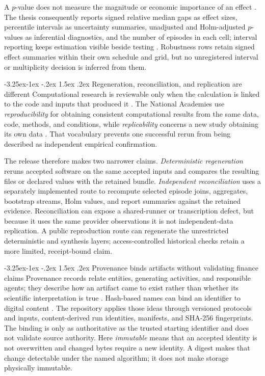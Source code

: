 \documentclass[12pt,a4paper,oneside]{report}
\makeatletter
\renewcommand\subsection{\@startsection{subsection}{2}{\z@}%
  {-3.25ex\@plus -1ex \@minus -.2ex}%
  {1.5ex \@plus .2ex}%
  {\normalfont\fontsize{12}{15}\selectfont\bfseries}}
\makeatother
\begin{document}
A $p$-value does not measure the magnitude or economic importance of an effect
\citep{wassersteinlazar2016}. The thesis consequently reports signed relative
median gaps as effect sizes, percentile intervals as uncertainty summaries,
unadjusted and Holm-adjusted $p$-values as inferential diagnostics, and the
number of episodes in each cell; interval reporting keeps estimation visible
beside testing \citep{gardneraltman1986}. Robustness rows retain signed effect
summaries within their own schedule and grid, but no unregistered interval or
multiplicity decision is inferred from them.

\subsection{Regeneration, reconciliation, and replication are different}
\label{sec:lit-method-computational-reproducibility}
Computational research is reviewable only when the calculation is linked to
the code and inputs that produced it \citep{peng2011reproducible}. The National
Academies use \emph{reproducibility} for obtaining consistent computational
results from the same data, code, methods, and conditions, while
\emph{replicability} concerns a new study obtaining its own data
\citep{nasem2019reproducibility}. That vocabulary prevents one successful
rerun from being described as independent empirical confirmation.

The release therefore makes two narrower claims. \emph{Deterministic
regeneration} reruns accepted software on the same accepted inputs and compares
the resulting files or declared values with the retained bundle.
\emph{Independent reconciliation} uses a separately implemented route to
recompute selected episode joins, aggregates, bootstrap streams, Holm values,
and report summaries against the retained evidence. Reconciliation can expose
a shared-runner or transcription defect, but because it uses the same provider
observations it is not independent-data replication. A public reproduction
route can regenerate the unrestricted deterministic and synthesis layers;
access-controlled historical checks retain a more limited, receipt-bound
claim.

\subsection{Provenance binds artifacts without validating finance claims}
\label{sec:lit-method-provenance-release}
Provenance records relate entities, generating activities, and responsible
agents; they describe how an artifact came to exist rather than whether its
scientific interpretation is true \citep{moreaumissier2013prov}. Hash-based
names can bind an identifier to digital content
\citep{farrell2013rfc6920}. The repository applies those ideas through
versioned protocols and inputs, content-derived run identities, manifests, and
SHA-256 fingerprints. The binding is only as authoritative as the trusted
starting identifier and does not validate source authority. Here
\emph{immutable} means that an accepted identity is not overwritten and changed
bytes require a new identity. A digest makes that change detectable under the
named algorithm; it does not make storage physically immutable.
\end{document}
